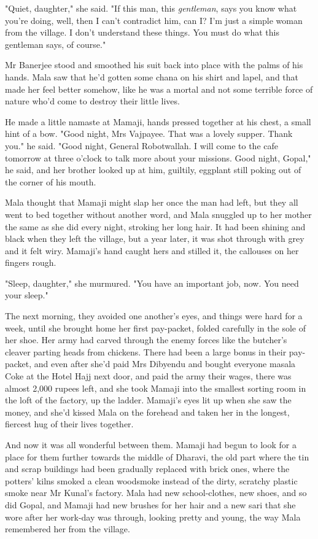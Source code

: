 "Quiet, daughter," she said. "If this man, this \emph{gentleman},
says you know what you're doing, well, then I can't contradict him,
can I? I'm just a simple woman from the village. I don't understand
these things. You must do what this gentleman says, of course."

Mr Banerjee stood and smoothed his suit back into place with the
palms of his hands. Mala saw that he'd gotten some chana on his
shirt and lapel, and that made her feel better somehow, like he was
a mortal and not some terrible force of nature who'd come to
destroy their little lives.

He made a little namaste at Mamaji, hands pressed together at his
chest, a small hint of a bow. "Good night, Mrs Vajpayee. That was a
lovely supper. Thank you." he said. "Good night, General
Robotwallah. I will come to the cafe tomorrow at three o'clock to
talk more about your missions. Good night, Gopal," he said, and her
brother looked up at him, guiltily, eggplant still poking out of
the corner of his mouth.

Mala thought that Mamaji might slap her once the man had left, but
they all went to bed together without another word, and Mala
snuggled up to her mother the same as she did every night, stroking
her long hair. It had been shining and black when they left the
village, but a year later, it was shot through with grey and it
felt wiry. Mamaji's hand caught hers and stilled it, the callouses
on her fingers rough.

"Sleep, daughter," she murmured. "You have an important job, now.
You need your sleep."

The next morning, they avoided one another's eyes, and things were
hard for a week, until she brought home her first pay-packet,
folded carefully in the sole of her shoe. Her army had carved
through the enemy forces like the butcher's cleaver parting heads
from chickens. There had been a large bonus in their pay-packet,
and even after she'd paid Mrs Dibyendu and bought everyone masala
Coke at the Hotel Hajj next door, and paid the army their wages,
there was almost 2,000 rupees left, and she took Mamaji into the
smallest sorting room in the loft of the factory, up the ladder.
Mamaji's eyes lit up when she saw the money, and she'd kissed Mala
on the forehead and taken her in the longest, fiercest hug of their
lives together.

And now it was all wonderful between them. Mamaji had begun to look
for a place for them further towards the middle of Dharavi, the old
part where the tin and scrap buildings had been gradually replaced
with brick ones, where the potters' kilns smoked a clean woodsmoke
instead of the dirty, scratchy plastic smoke near Mr Kunal's
factory. Mala had new school-clothes, new shoes, and so did Gopal,
and Mamaji had new brushes for her hair and a new sari that she
wore after her work-day was through, looking pretty and young, the
way Mala remembered her from the village.

